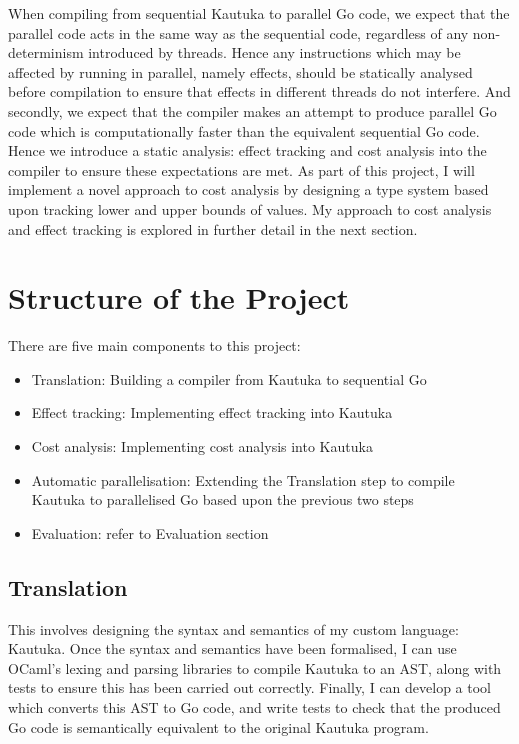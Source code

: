 \begin{refsection}
  When compiling from sequential Kautuka to parallel Go code, we expect that the parallel code acts in the same way as the sequential code, regardless of any non-determinism introduced by threads. Hence any instructions which may be affected by running in parallel, namely effects, should be statically analysed before compilation to ensure that effects in different threads do not interfere. And secondly, we expect that the compiler makes an attempt to produce parallel Go code which is computationally faster than the equivalent sequential Go code. Hence we introduce a static analysis: effect tracking and cost analysis into the compiler to ensure these expectations are met. As part of this project, I will implement a novel approach to cost analysis by designing a type system based upon tracking lower and upper bounds of values. My approach to cost analysis and effect tracking is explored in further detail in the next section.

  \newpage 

  \section{Structure of the Project}

  There are five main components to this project:
  \begin{itemize}
    \item Translation: Building a compiler from Kautuka to sequential Go
    \item Effect tracking: Implementing effect tracking into Kautuka 
    \item Cost analysis: Implementing cost analysis into Kautuka 
    \item Automatic parallelisation: Extending the Translation step to compile Kautuka to parallelised Go based upon the previous two steps
    \item Evaluation: refer to Evaluation section
  \end{itemize}

  \subsection*{Translation}

  This involves designing the syntax and semantics of my custom language: Kautuka. Once the syntax and semantics have been formalised, I can use OCaml's lexing and parsing libraries to compile Kautuka to an AST, along with tests to ensure this has been carried out correctly. Finally, I can develop a tool which converts this AST to Go code, and write tests to check that the produced Go code is semantically equivalent to the original Kautuka program. 


\end{refsection}
